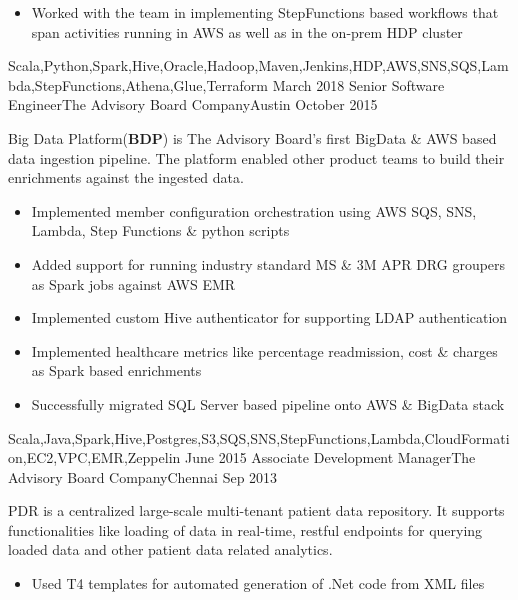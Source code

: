 \begin{experiences}
{\begin{itemize}
                       	\item Worked with the team in implementing StepFunctions based workflows that span activities running in AWS as well as in the on-prem HDP cluster\\ 
                      \end{itemize}
                    }
                    {Scala,Python,Spark,Hive,Oracle,Hadoop,Maven,Jenkins,HDP,AWS,SNS,SQS,Lambda,StepFunctions,Athena,Glue,Terraform}
  \emptySeparator
  \experience
    {March 2018} {Senior Software Engineer}{The Advisory Board Company}{Austin}
    {October 2015}    
    			 {
    	              Big Data Platform(\textbf{BDP}) is The Advisory Board's first BigData \& AWS based data ingestion pipeline. The platform enabled other product teams to build their enrichments against the ingested data. 
    	              \begin{itemize}
    	              	\item Implemented member configuration orchestration using AWS SQS, SNS, Lambda, Step Functions \& python scripts                           
    	              	\item Added support for running industry standard MS \& 3M APR DRG groupers as Spark jobs against AWS EMR                        
    	              	\item Implemented custom Hive authenticator for supporting LDAP  authentication  
    	              	\item Implemented healthcare metrics like percentage readmission, cost \& charges as Spark based enrichments                
    	              	\item Successfully migrated SQL Server based pipeline onto AWS \& BigData stack\\
    	              \end{itemize}
                  }
              {Scala,Java,Spark,Hive,Postgres,S3,SQS,SNS,StepFunctions,Lambda,CloudFormation,EC2,VPC,EMR,Zeppelin}
  \emptySeparator
  \experience
    {June 2015}     {Associate Development Manager}{The Advisory Board Company}{Chennai}
    {Sep 2013}    {
    	              PDR is a centralized large-scale multi-tenant patient data repository. It supports functionalities like loading of data in real-time, restful endpoints for querying loaded data and other patient data related analytics.
                      \begin{itemize}
                        \item Used T4 templates for automated generation of .Net code from XML files

\end{itemize}}
\end{experiences}
